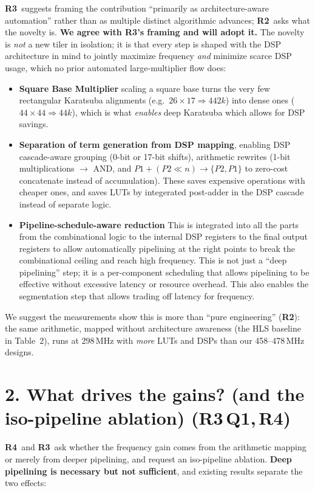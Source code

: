 \documentclass[10pt]{article}
\newcommand{\Rb}{\textbf{\textcolor{c2}{R2}}}
\newcommand{\Rc}{\textbf{\textcolor{c3}{R3}}}
\newcommand{\Rd}{\textbf{\textcolor{c4}{R4}}}
\begin{document}
\Rc\ suggests framing the contribution ``primarily as architecture-aware automation'' rather than as multiple distinct algorithmic advances; \Rb\ asks what the novelty is.
\textbf{We agree with \Rc's framing and will adopt it.}
The novelty is \emph{not} a new tiler in isolation; it is that every step is shaped with the DSP architecture in mind to jointly maximize frequency \emph{and} minimize scarce DSP usage, which no prior automated large-multiplier flow does:
\begin{itemize}
\item \textbf{Square Base Multiplier} scaling a square base turns the very few rectangular Karatsuba alignments (e.g.\ $26{\times}17\Rightarrow442k$) into dense ones ($44{\times}44\Rightarrow44k$), which is what \emph{enables} deep Karatsuba which allows for DSP savings.
\item \textbf{Separation of term generation from DSP mapping}, enabling DSP cascade-aware grouping (0-bit or 17-bit shifts), arithmetic rewrites (1-bit multiplications $\to$ AND, and $P1+(P2{\ll}n)\to\{P2,P1\}$ to zero-cost concatenate instead of accumulation).
These saves expensive operations with cheaper ones, and saves LUTs by integerated post-adder in the DSP cascade instead of separate logic.
\item \textbf{Pipeline-schedule-aware reduction} This is integrated into all the parts from the combinational logic to the internal DSP registers to the final output registers to allow automatically pipelining at the right points to break the combinational ceiling and reach high frequency.
This is not just a ``deep pipelining'' step; it is a per-component scheduling that allows pipelining to be effective without excessive latency or resource overhead.
This also enables the segmentation step that allows trading off latency for frequency.
\end{itemize}
We suggest the measurements show this is more than ``pure engineering'' (\Rb): the same arithmetic, mapped without architecture awareness (the HLS baseline in Table~2), runs at 298\,MHz with \emph{more} LUTs and DSPs than our 458--478\,MHz designs.

\section*{2. What drives the gains? (and the iso-pipeline ablation) \hfill {\normalsize(\Rc\,Q1,\,\Rd)}}

\Rd\ and \Rc\ ask whether the frequency gain comes from the arithmetic mapping or merely from deeper pipelining, and request an iso-pipeline ablation.
\textbf{Deep pipelining is necessary but not sufficient}, and existing results separate the two effects:
\end{document}
